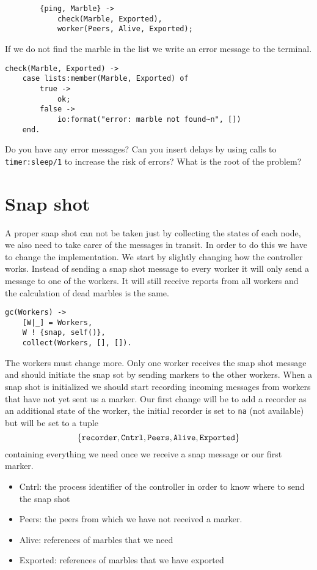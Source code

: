 \documentclass[a4paper,11pt]{article}
\begin{document}
\begin{verbatim}
        {ping, Marble} ->
            check(Marble, Exported),
            worker(Peers, Alive, Exported);         

\end{verbatim}

If we do not find the marble in the list we write an error message to the terminal.

\begin{verbatim}
check(Marble, Exported) ->
    case lists:member(Marble, Exported) of
        true ->
            ok;
        false ->
            io:format("error: marble not found~n", [])
    end.
\end{verbatim}

Do you have any error messages? Can you insert delays by using calls
to {\tt timer:sleep/1} to increase the risk of errors? What is the
root of the problem?

\section{Snap shot}

A proper snap shot can not be taken just by collecting the states of
each node, we also need to take carer of the messages in transit. In
order to do this we have to change the implementation. We start by
slightly changing how the controller works. Instead of sending a snap
shot message to every worker it will only send a message to one of the
workers. It will still receive reports from all workers and the
calculation of dead marbles is the same.

\begin{verbatim}
gc(Workers) ->
    [W|_] = Workers,
    W ! {snap, self()},
    collect(Workers, [], []).
\end{verbatim}

The workers must change more. Only one worker receives the snap shot
message and should initiate the snap sot by sending markers to the
other workers. When a snap shot is initialized we should start
recording incoming messages from workers that have not yet sent us a
marker. Our first change will be to add a recorder as an additional
state of the worker, the initial recorder is set to {\tt na} (not
available) but will be set to a tuple $${\tt\{recorder, Cntrl, Peers,
  Alive, Exported\}}$$containing everything we need once we receive a
snap message or our first marker.

\begin{itemize}
\item {Cntrl}: the process identifier of the controller in order to know where to send the snap shot
\item {Peers:} the peers from which we have not received a marker.
\item {Alive:} references of marbles that we need
\item {Exported:} references of marbles that we have exported
\end{itemize}
\end{document}
